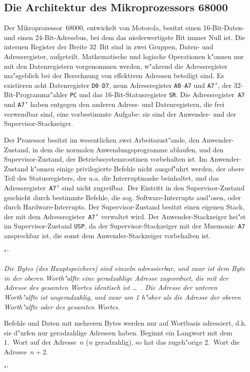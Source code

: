 \subsection{Die Architektur des Mikroprozessors 68000}

Der Mikroprozessor~68000, entwickelt von Motorola, besitzt einen
16-Bit-Daten- und einen 24-Bit-Adressbus, bei dem das niederwertigste
Bit immer Null ist.
Die internen Register der Breite 32~Bit sind in zwei Gruppen, Daten-
und Adressregister, aufgeteilt.
Mathematische und logische Operationen k"onnen nur mit den Datenregistern
vorgenommen werden, w"ahrend die Adressregister ma"sgeblich bei der
Berechnung von effektiven Adressen beteiligt sind.
Es existieren acht Datenregister {\tt D0}--{\tt D7}, neun
Adressregister {\tt A0}--{\tt A7} und {\tt A7'}, der 32-Bit-Programmz"ahler {\tt PC}
und das 16-Bit-Statusregister {\tt SR}.
Die Adressregister~{\tt A7} und {\tt A7'} haben entgegen den anderen
Adress- und Datenregistern, die frei verwendbar sind, eine vorbestimmte Aufgabe:
sie sind der Anwender- und der Supervisor-Stackzeiger.

Der Prozessor besitzt im wesentlichen zwei Arbeitszust"ande, den Anwender-Zustand,
in dem die normalen Anwendungsprogramme ablaufen, und den Supervisor-Zustand,
der Betriebssystemroutinen vorbehalten ist.
Im Anwender-Zustand k"onnen einige privilegierte Befehle nicht ausgef"uhrt werden,
der obere Teil des Statusregisters, der u.a. die Interruptmaske beinhaltet,
und das Adressregister~{\tt A7'} sind nicht zugreifbar.
Der Eintritt in den Supervisor-Zustand geschieht durch bestimmte Befehle, die
sog. Software-Interrupts ausl"osen, oder durch Hardware-Interrupts.
Der Supervisor-Zustand besitzt einen eigenen Stack, der mit dem
Adressregister~{\tt A7'} verwaltet wird.
Der Anwender-Stackzeiger hei"st im Supervisor-Zustand {\tt USP}, da der
Supervisor-Stackzeiger mit der Mnemonic~{\tt A7} ansprechbar ist, die sonst
dem Anwender-Stackzeiger vorbehalten ist.

"`{\it Die Bytes\/ {\rm (des Hauptspeichers)} sind einzeln adressierbar, und
zwar ist dem Byte in der oberen Worth"alfte eine geradzahlige Adresse zugeordnet,
die mit der Adresse des gesamten Wortes identisch ist \ldots\ . Die Adresse
der unteren Worth"alfte ist ungeradzahlig, und zwar um 1 h"oher als die Adresse der
oberen Worth"alfte oder des gesamten Wortes.

Befehle und Daten mit mehreren Bytes werden nur auf Wortbasis adressiert, d.h.
sie d"urfen nur geradzahlige Adressen haben.
Beginnt ein Langwort mit dem 1.~Wort auf der Adresse~$n$ ($n$ geradzahlig), so
hat das zugeh"orige 2.~Wort die Adresse~$n+2$.\/}"' \cite[S.~17]{SC68000}

